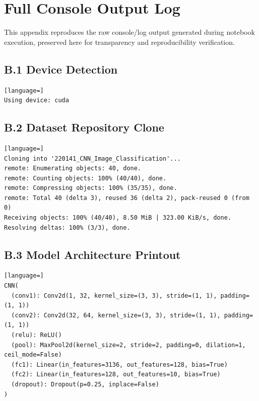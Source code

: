\documentclass[12pt,a4paper]{report}
\begin{document}
\chapter{Full Console Output Log}

This appendix reproduces the raw console/log output generated during notebook execution, preserved here for transparency and reproducibility verification.

\section*{B.1 Device Detection}
\begin{lstlisting}[language=]
Using device: cuda
\end{lstlisting}

\section*{B.2 Dataset Repository Clone}
\begin{lstlisting}[language=]
Cloning into '220141_CNN_Image_Classification'...
remote: Enumerating objects: 40, done.
remote: Counting objects: 100% (40/40), done.
remote: Compressing objects: 100% (35/35), done.
remote: Total 40 (delta 3), reused 36 (delta 2), pack-reused 0 (from 0)
Receiving objects: 100% (40/40), 8.50 MiB | 323.00 KiB/s, done.
Resolving deltas: 100% (3/3), done.
\end{lstlisting}

\section*{B.3 Model Architecture Printout}
\begin{lstlisting}[language=]
CNN(
  (conv1): Conv2d(1, 32, kernel_size=(3, 3), stride=(1, 1), padding=(1, 1))
  (conv2): Conv2d(32, 64, kernel_size=(3, 3), stride=(1, 1), padding=(1, 1))
  (relu): ReLU()
  (pool): MaxPool2d(kernel_size=2, stride=2, padding=0, dilation=1, ceil_mode=False)
  (fc1): Linear(in_features=3136, out_features=128, bias=True)
  (fc2): Linear(in_features=128, out_features=10, bias=True)
  (dropout): Dropout(p=0.25, inplace=False)
)
\end{lstlisting}
\end{document}
